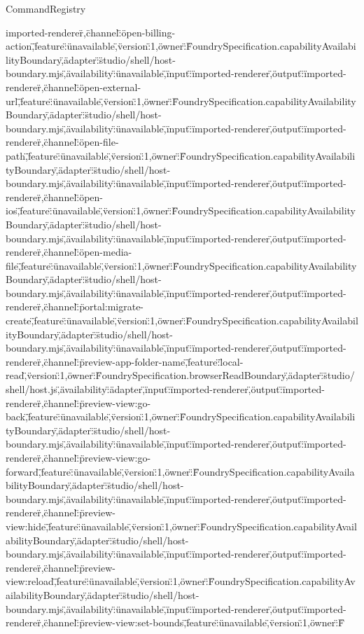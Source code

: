 \begin{lexlean}{CommandRegistry}
\begin{semanticmodule}
{imported-renderer\"},{\"channel\":\"open-billing-action\",\"feature\":\"unavailable\",\"version\":1,\"owner\":\"FoundrySpecification.capabilityAvailabilityBoundary\",\"adapter\":\"studio/shell/host-boundary.mjs\",\"availability\":\"unavailable\",\"input\":\"imported-renderer\",\"output\":\"imported-renderer\"},{\"channel\":\"open-external-url\",\"feature\":\"unavailable\",\"version\":1,\"owner\":\"FoundrySpecification.capabilityAvailabilityBoundary\",\"adapter\":\"studio/shell/host-boundary.mjs\",\"availability\":\"unavailable\",\"input\":\"imported-renderer\",\"output\":\"imported-renderer\"},{\"channel\":\"open-file-path\",\"feature\":\"unavailable\",\"version\":1,\"owner\":\"FoundrySpecification.capabilityAvailabilityBoundary\",\"adapter\":\"studio/shell/host-boundary.mjs\",\"availability\":\"unavailable\",\"input\":\"imported-renderer\",\"output\":\"imported-renderer\"},{\"channel\":\"open-ios\",\"feature\":\"unavailable\",\"version\":1,\"owner\":\"FoundrySpecification.capabilityAvailabilityBoundary\",\"adapter\":\"studio/shell/host-boundary.mjs\",\"availability\":\"unavailable\",\"input\":\"imported-renderer\",\"output\":\"imported-renderer\"},{\"channel\":\"open-media-file\",\"feature\":\"unavailable\",\"version\":1,\"owner\":\"FoundrySpecification.capabilityAvailabilityBoundary\",\"adapter\":\"studio/shell/host-boundary.mjs\",\"availability\":\"unavailable\",\"input\":\"imported-renderer\",\"output\":\"imported-renderer\"},{\"channel\":\"portal:migrate-create\",\"feature\":\"unavailable\",\"version\":1,\"owner\":\"FoundrySpecification.capabilityAvailabilityBoundary\",\"adapter\":\"studio/shell/host-boundary.mjs\",\"availability\":\"unavailable\",\"input\":\"imported-renderer\",\"output\":\"imported-renderer\"},{\"channel\":\"preview-app-folder-name\",\"feature\":\"local-read\",\"version\":1,\"owner\":\"FoundrySpecification.browserReadBoundary\",\"adapter\":\"studio/shell/host.js\",\"availability\":\"adapter\",\"input\":\"imported-renderer\",\"output\":\"imported-renderer\"},{\"channel\":\"preview-view:go-back\",\"feature\":\"unavailable\",\"version\":1,\"owner\":\"FoundrySpecification.capabilityAvailabilityBoundary\",\"adapter\":\"studio/shell/host-boundary.mjs\",\"availability\":\"unavailable\",\"input\":\"imported-renderer\",\"output\":\"imported-renderer\"},{\"channel\":\"preview-view:go-forward\",\"feature\":\"unavailable\",\"version\":1,\"owner\":\"FoundrySpecification.capabilityAvailabilityBoundary\",\"adapter\":\"studio/shell/host-boundary.mjs\",\"availability\":\"unavailable\",\"input\":\"imported-renderer\",\"output\":\"imported-renderer\"},{\"channel\":\"preview-view:hide\",\"feature\":\"unavailable\",\"version\":1,\"owner\":\"FoundrySpecification.capabilityAvailabilityBoundary\",\"adapter\":\"studio/shell/host-boundary.mjs\",\"availability\":\"unavailable\",\"input\":\"imported-renderer\",\"output\":\"imported-renderer\"},{\"channel\":\"preview-view:reload\",\"feature\":\"unavailable\",\"version\":1,\"owner\":\"FoundrySpecification.capabilityAvailabilityBoundary\",\"adapter\":\"studio/shell/host-boundary.mjs\",\"availability\":\"unavailable\",\"input\":\"imported-renderer\",\"output\":\"imported-renderer\"},{\"channel\":\"preview-view:set-bounds\",\"feature\":\"unavailable\",\"version\":1,\"owner\":\"F}
\end{semanticmodule}
\end{lexlean}
